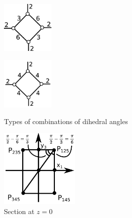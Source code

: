 \documentclass[suppldata, dvipdfmx]{interact}
\theoremstyle{plain}%
\theoremstyle{definition}
\theoremstyle{remark}
\theoremstyle{problemstyle}
\begin{document}
\begin{figure}[h!tbp]
 \hspace*{\fill}
 \begin{minipage}[t]{0.24\textwidth}
   \centering
   \includegraphics[width=1in,
   keepaspectratio]{./img/HexahedraWithSphericalFaces/pentahedralPyramid/a.jpg}
   \label{fig:quadrangularPyramid1}
 \end{minipage}
 \hspace*{\fill}
 \begin{minipage}[t]{0.24\textwidth}
   \centering
   \includegraphics[width=1in, keepaspectratio]{./img/HexahedraWithSphericalFaces/pentahedralPyramid/b.jpg}
   \label{fig:quadrangularPyramid2}
 \end{minipage}
 \hspace*{\fill}
 \caption{Types of combinations of dihedral angles}
  \label{fig:quadrangularPyramidCombinations}
\end{figure}
\begin{figure}[h!tbp]
   \centering
   \includegraphics[width=1.5in, keepaspectratio]{./img/HexahedraWithSphericalFaces/pentahedralPyramid/proofQuadrangularPyramid.jpg}
   \caption{Section at $z=0$}
   \label{fig:quadrangularPyramidAtOrigin}
 \hspace*{\fill}
\end{figure}
\end{document}
